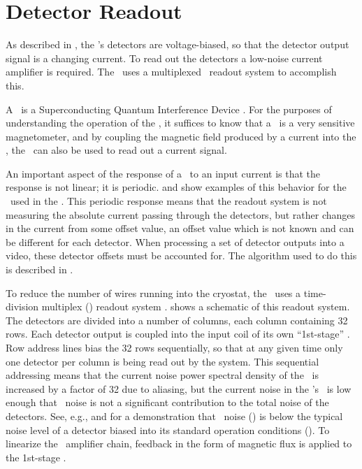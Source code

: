 \section{Detector Readout} \label{sec:det-readout}

As described in , the \Imager's detectors are voltage-biased, so that the detector output signal is a changing current.
To read out the detectors a low-noise current amplifier is required.
The \Imager\ uses a multiplexed \SQUID\ readout system to accomplish this.

A \SQUID\ is a Superconducting Quantum Interference Device \cite{clarke_squid_2002}.
For the purposes of understanding the operation of the \Imager, it suffices to know that a \SQUID\ is a very sensitive magnetometer, and by coupling the magnetic field produced by a current into the \SQUID, the \SQUID\ can also be used to read out a current signal.

An important aspect of the response of a \SQUID\ to an input current is that the response is not linear; it is periodic.
 and  show examples of this behavior for the \SQUIDs\ used in the \Imager.
This periodic response means that the readout system is not measuring the absolute current passing through the detectors, but rather changes in the current from some offset value, an offset value which is not known and can be different for each detector.
When processing a set of detector outputs into a video, these detector offsets must be accounted for.
The algorithm used to do this is described in .

To reduce the number of wires running into the cryostat, the \Imager\ uses a time-division multiplex (\TDM) readout system \cite{chervenak_superconducting_1999,korte_time-division_2003,reintsema_prototype_2003}.
 shows a schematic of this readout system.
The detectors are divided into a number of columns, each column containing 32 rows.
Each detector output is coupled into the input coil of its own ``1st-stage'' \SQUID.
Row address lines bias the 32 rows sequentially, so that at any given time only one detector per column is being read out by the system.
This sequential addressing means that the current noise power spectral density of the \SQUIDs\ is increased by a factor of 32 due to aliasing, but the current noise in the \Imager's \SQUIDs\ is low enough that \SQUID\ noise is not a significant contribution to the total noise of the detectors.
See, e.g.,  and  for a demonstration that \SQUID\ noise () is below the typical noise level of a detector biased into its standard operation conditions ().
To linearize the \SQUID\ amplifier chain, feedback in the form of magnetic flux is applied to the 1st-stage \SQUIDs.

